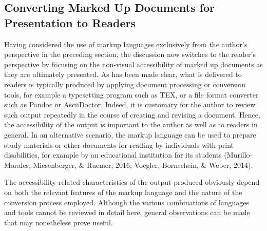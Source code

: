 \documentclass[11pt]{sig-alternate}
\begin{document}
\begin{large}
\section*{Converting Marked Up Documents for \\Presentation to Readers}
Having considered the use of markup languages exclusively from the author’s perspective in the preceding section, the discussion now switches to the reader’s perspective by focusing on the non-visual accessibility of marked up documents as they are ultimately presented. As has been made clear, what is delivered to readers is typically produced by applying document processing or conversion tools, for example a typesetting program such as TEX, or a file format converter such as Pandoc or AsciiDoctor. Indeed, it is customary for the author to review such output repeatedly in the course of creating and revising a document. Hence, the accessibility of the output is important to the author as well as to readers in general. In an alternative scenario, the markup language can be used to prepare study materials or other documents for reading by individuals with print disabilities, for example by an educational institution for its students (Murillo-Morales, Miesenberger, \& Ruemer, 2016; Voegler, Bornschein, \& Weber, 2014).

The accessibility-related characteristics of the output produced obviously depend on both the relevant features of the markup language and the nature of the conversion process employed. Although the various combinations of languages and tools cannot be reviewed in detail here, general observations can be made that may nonetheless prove useful.


\end{large}
\end{document}
